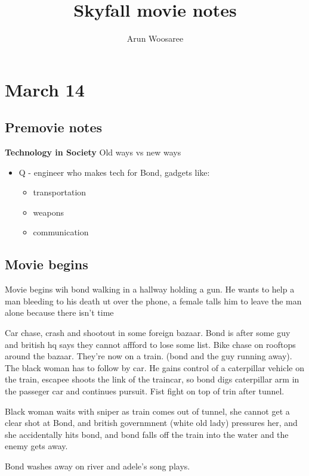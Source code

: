 \documentclass{article}
\title{Skyfall movie notes}
\author{Arun Woosaree}
\begin{document}
  \maketitle %

  \section{March 14}
  \subsection{Premovie notes}
  \textbf{Technology in Society}
    Old ways vs new ways
  \begin{itemize}
    \item Q - engineer who makes tech for Bond, gadgets like:
            \begin{itemize}
              \item transportation
              \item weapons
              \item communication
            \end{itemize}
  \end{itemize}

  \subsection{Movie begins}
  Movie begins wih bond walking in a hallway holding a gun.
  He wants to help a man bleeding to his death ut over the phone, a female talls him
  to leave the man alone because there isn't time

  Car chase, crash and shootout in some foreign bazaar. Bond is after some guy
  and british hq says they cannot affford to lose some list. Bike chase on rooftops
  around the bazaar. They're now on a train. (bond and the guy running away). The black woman has to follow
  by car. He gains control of a caterpillar vehicle on the train, escapee shoots the link of the traincar,
  so bond digs caterpillar arm in the passeger car and continues pursuit. Fist fight on top of trin after tunnel.

  Black woman waits with sniper as train comes out of tunnel, she cannot get a clear shot at Bond, and
  british governmnent (white old lady) pressures her, and she accidentally hits bond, and bond falls off the train into the water
  and the enemy gets away.

  Bond washes away on river and adele's song plays.
\end{document}
